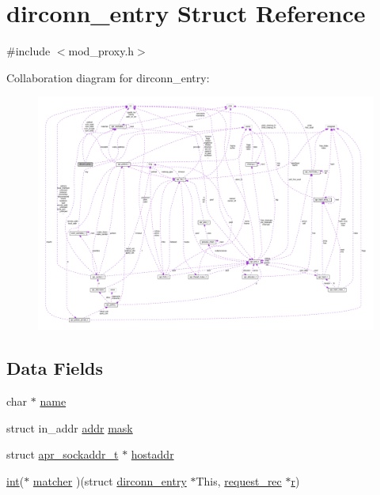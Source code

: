 \hypertarget{structdirconn__entry}{}\section{dirconn\+\_\+entry Struct Reference}
\label{structdirconn__entry}


{\ttfamily \#include $<$mod\+\_\+proxy.\+h$>$}



Collaboration diagram for dirconn\+\_\+entry\+:
\nopagebreak
\begin{figure}[H]
\begin{center}
\leavevmode
\includegraphics[width=350pt]{structdirconn__entry__coll__graph}
\end{center}
\end{figure}
\subsection*{Data Fields}
\begin{DoxyCompactItemize}
\item 
char $\ast$ \hyperlink{structdirconn__entry_ac63187ca19d8218bc6437ddc42fe57bc}{name}
\item 
struct in\+\_\+addr \hyperlink{group__apr__mcast_gaf32a3eae6659774e82d8fc61ebc0169d}{addr} \hyperlink{structdirconn__entry_a89e0da84c51df90f9624b74f3858e3cf}{mask}
\item 
struct \hyperlink{structapr__sockaddr__t}{apr\+\_\+sockaddr\+\_\+t} $\ast$ \hyperlink{structdirconn__entry_ae1a538ebabadc0969047f6e7a2dbd880}{hostaddr}
\item 
\hyperlink{pcre_8txt_a42dfa4ff673c82d8efe7144098fbc198}{int}($\ast$ \hyperlink{structdirconn__entry_a42e6e388030a0a4464df399287d174ae}{matcher} )(struct \hyperlink{structdirconn__entry}{dirconn\+\_\+entry} $\ast$This, \hyperlink{structrequest__rec}{request\+\_\+rec} $\ast$\hyperlink{pcregrep_8txt_a2e9e9438b26c0bb4425367a7e4f75eb3}{r})
\end{DoxyCompactItemize}


